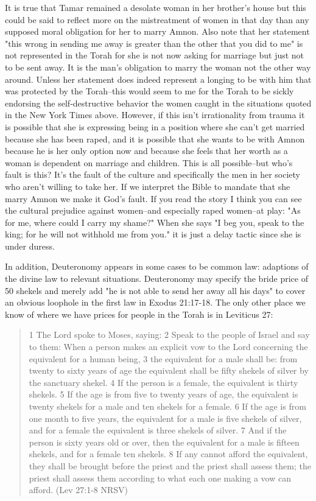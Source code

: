 \documentclass[11pt]{article}
\begin{document}
It is true that Tamar remained a desolate woman in her brother's house but this could be said to reflect more on the mistreatment of women in that day than any supposed moral obligation for her to marry Amnon. Also note that her statement "this wrong in sending me away is greater than the other that you did to me" is not represented in the Torah for she is not now asking for marriage but just not to be sent away. It is the man's obligation to marry the woman not the other way around. Unless her statement does indeed represent a longing to be with him that was protected by the Torah--this would seem to me for the Torah to be sickly endorsing the self-destructive behavior the women caught in the situations quoted in the New York Times above. However, if this isn't irrationality from trauma it is possible that she is expressing being in a position where she can't get married because she has been raped, and it is possible that she wants to be with Amnon because he is her only option now and because she feels that her worth as a woman is dependent on marriage and children. This is all possible--but who's fault is this? It's the fault of the culture and specifically the men in her society who aren't willing to take her. If we interpret the Bible to mandate that she marry Amnon we make it God's fault. If you read the story I think you can see the cultural prejudice against women--and especially raped women--at play: "As for me, where could I carry my shame?" When she says "I beg you, speak to the king; for he will not withhold me from you." it is just a delay tactic since she is under duress. 

In addition, Deuteronomy appears in some cases to be common law: adaptions of the divine law to relevant situations. Deuteronomy may specify the bride price of 50 shekels and merely add "he is not able to send her away all his days" to cover an obvious loophole in the first law in Exodus 21:17-18. The only other place we know of where we have prices for people in the Torah is in Leviticus 27:

\begin{quote}
1 The Lord spoke to Moses, saying: 2 Speak to the people of Israel and say to them: When a person makes an explicit vow to the Lord concerning the equivalent for a human being, 3 the equivalent for a male shall be: from twenty to sixty years of age the equivalent shall be fifty shekels of silver by the sanctuary shekel. 4 If the person is a female, the equivalent is thirty shekels. 5 If the age is from five to twenty years of age, the equivalent is twenty shekels for a male and ten shekels for a female. 6 If the age is from one month to five years, the equivalent for a male is five shekels of silver, and for a female the equivalent is three shekels of silver. 7 And if the person is sixty years old or over, then the equivalent for a male is fifteen shekels, and for a female ten shekels. 8 If any cannot afford the equivalent, they shall be brought before the priest and the priest shall assess them; the priest shall assess them according to what each one making a vow can afford. (Lev 27:1-8 NRSV)
\end{quote} 
\end{document}
